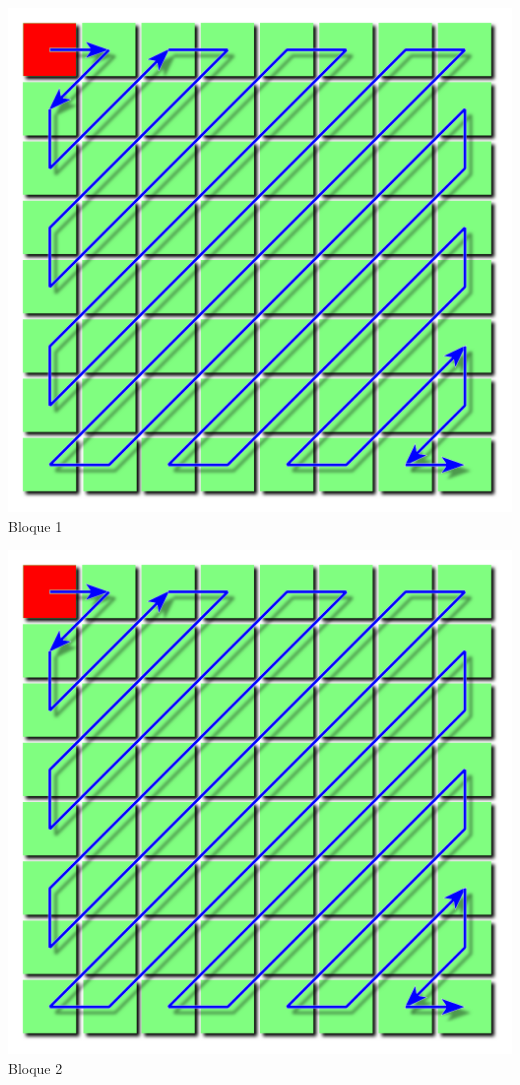 \documentclass{beamer}
\begin{document}
\begin{frame}
\begin{minipage}[t]{0.3\linewidth}
\begin{center}
        \includegraphics[scale=0.10]{fig/zigzag_dc.png}\\
        \small Bloque 1
        \end{center}
    \end{minipage}
    \hfill
    \begin{minipage}[t]{0.3\linewidth}
        \begin{center}
        \includegraphics[scale=0.10]{fig/zigzag_dc.png}\\
        \small Bloque 2
        \end{center}
    \end{minipage}
\end{frame}
\end{document}
